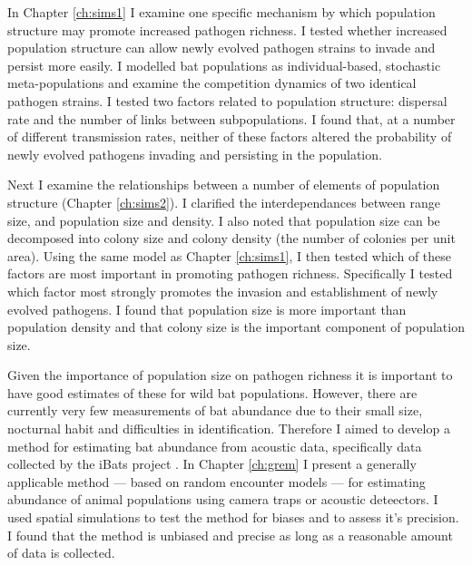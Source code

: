 
In Chapter \ref{ch:sims1} I examine one specific mechanism by which population structure may promote increased pathogen richness.
I tested whether increased population structure can allow newly evolved pathogen strains to invade and persist more easily.
I modelled bat populations as individual-based, stochastic meta-populations and examine the competition dynamics of two identical pathogen strains.
I tested two factors related to population structure: dispersal rate and the number of links between subpopulations.
I found that, at a number of different transmission rates, neither of these factors altered the probability of newly evolved pathogens invading and persisting in the population.


Next I examine the relationships between a number of elements of population structure (Chapter \ref{ch:sims2}).
I clarified the interdependances between range size, and population size and density.
I also noted that population size can be decomposed into colony size and colony density (the number of colonies per unit area).
Using the same model as Chapter \ref{ch:sims1}, I then tested which of these factors are most important in promoting pathogen richness.
Specifically I tested which factor most strongly promotes the invasion and establishment of newly evolved pathogens.
I found that population size is more important than population density and that colony size is the important component of population size.


Given the importance of population size on pathogen richness it is important to have good estimates of these for wild bat populations.
However, there are currently very few measurements of bat abundance due to their small size, nocturnal habit and difficulties in identification.
Therefore I aimed to develop a method for estimating bat abundance from acoustic data, specifically data collected by the iBats project \cite{jones2011indicator}.
In Chapter \ref{ch:grem} I present a generally applicable method --- based on random encounter models \cite{rowcliffe2008estimating, yapp1956theory} --- for estimating abundance of animal populations using camera traps or acoustic deteectors.
I used spatial simulations to test the method for biases and to assess it's precision.
I found that the method is unbiased and precise as long as a reasonable amount of data is collected.














